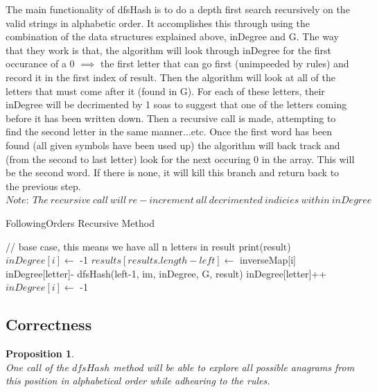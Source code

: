 \documentclass[12pt]{article}
\newtheorem{proposition}[theorem]{Proposition}
\begin{document}
The main functionality of dfsHash is to do a depth first search recursively on the valid strings in alphabetic order.
It accomplishes this through using the combination of the data structures explained above, inDegree and G. The way
that they work is that, the algorithm will look through inDegree for the first occurance of a 0 $\implies$ the first
letter that can go first (unimpeeded by rules) and record it in the first index of result. Then the algorithm will
look at all of the letters that must come after it (found in G). For each of these letters, their inDegree will be
decrimented by 1 soas to suggest that one of the letters coming before it has been written down. Then a recursive
call is made, attempting to find the second letter in the same manner...etc. Once the first word has been found (all
given symbols have been used up) the algorithm will back track and (from the second to last letter) look for the next
occuring 0 in the array. This will be the second word. If there is none, it will kill this branch and return back to the
previous step. $Note:\ The\ recursive\ call\ will\ re-increment\ all\ decrimented\ indicies\ within\ inDegree$

\begin{algorithm}[H]
\caption{FollowingOrders Recursive Method}
\begin{algorithmic}
        \State // base case, this means we have all n letters in result
            \State print(result)
        \EndIf
                \State $inDegree[i] \gets$ -1
                \State $results[results.length - left] \gets$ inverseMap[i]
                    \State inDegree[letter]-
                \EndFor
                dfsHash(left-1, im, inDegree, G, result)
                    \State inDegree[letter]++
                \EndFor
                \State $inDegree[i] \gets$ -1
            \EndIf
        \EndFor
    \EndProcedure
\end{algorithmic}
\end{algorithm}



\subsection{Correctness}
\begin{proposition}
~ \\ \indent One call of the $dfsHash$ method will be able to explore all possible anagrams from this position in
alphabetical order while adhearing to the rules.
\end{proposition}
\end{document}
